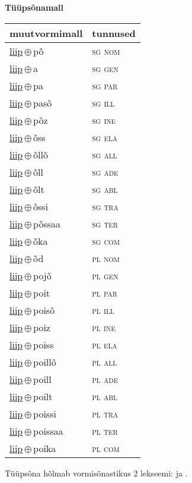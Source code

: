 

\vspace{3.5em}
\noindent \begin{minipage}{\textwidth}
\noindent \textbf{Tüüpsõnamall \,}\\

\begin{sideways}
\begin{tabular}{l l}
muutvormimall & tunnused \\
\hline
\underline{liip}\,$\oplus$\,põ & \textsc{ sg nom } \\
\underline{liip}\,$\oplus$\,a & \textsc{ sg gen } \\
\underline{liip}\,$\oplus$\,pa & \textsc{ sg par } \\
\underline{liip}\,$\oplus$\,pasõ & \textsc{ sg ill } \\
\underline{liip}\,$\oplus$\,põz & \textsc{ sg ine } \\
\underline{liip}\,$\oplus$\,õss & \textsc{ sg ela } \\
\underline{liip}\,$\oplus$\,õllõ & \textsc{ sg all } \\
\underline{liip}\,$\oplus$\,õll & \textsc{ sg ade } \\
\underline{liip}\,$\oplus$\,õlt & \textsc{ sg abl } \\
\underline{liip}\,$\oplus$\,õssi & \textsc{ sg tra } \\
\underline{liip}\,$\oplus$\,põssaa & \textsc{ sg ter } \\
\underline{liip}\,$\oplus$\,õka & \textsc{ sg com } \\
\underline{liip}\,$\oplus$\,õd & \textsc{ pl nom } \\
\underline{liip}\,$\oplus$\,pojõ & \textsc{ pl gen } \\
\underline{liip}\,$\oplus$\,poit & \textsc{ pl par } \\
\underline{liip}\,$\oplus$\,poisõ & \textsc{ pl ill } \\
\underline{liip}\,$\oplus$\,poiz & \textsc{ pl ine } \\
\underline{liip}\,$\oplus$\,poiss & \textsc{ pl ela } \\
\underline{liip}\,$\oplus$\,poillõ & \textsc{ pl all } \\
\underline{liip}\,$\oplus$\,poill & \textsc{ pl ade } \\
\underline{liip}\,$\oplus$\,poilt & \textsc{ pl abl } \\
\underline{liip}\,$\oplus$\,poissi & \textsc{ pl tra } \\
\underline{liip}\,$\oplus$\,poissaa & \textsc{ pl ter } \\
\underline{liip}\,$\oplus$\,poika & \textsc{ pl com } \\
\end{tabular}
\end{sideways}
\label{tab:tüüpsõnamall-liippõ}

\end{minipage}

 
\vspace{1em}
\noindent Tüüpsõna hõlmab vormisõnastikus 2 lekseemi:  ja .
